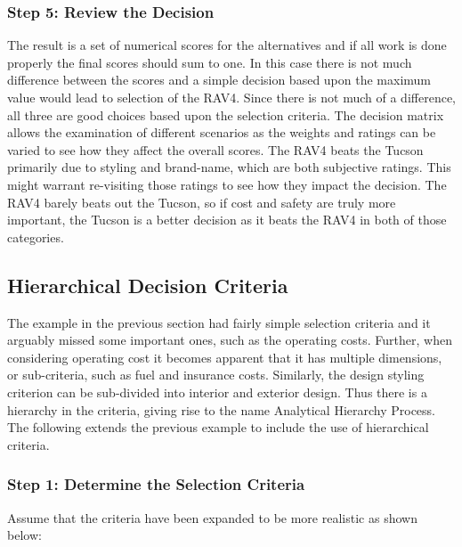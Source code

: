 \subsubsection*{Step 5: Review the
Decision}\label{step-5-review-the-decision}

The result is a set of numerical scores for the alternatives and if all
work is done properly the final scores should sum to one. In this case
there is not much difference between the scores and a simple decision
based upon the maximum value would lead to selection of the RAV4. Since
there is not much of a difference, all three are good choices based upon
the selection criteria. The decision matrix allows the examination of
different scenarios as the weights and ratings can be varied to see how
they affect the overall scores. The RAV4 beats the Tucson primarily due
to styling and brand-name, which are both subjective ratings. This might
warrant re-visiting those ratings to see how they impact the decision.
The RAV4 barely beats out the Tucson, so if cost and safety are truly
more important, the Tucson is a better decision as it beats the RAV4 in
both of those categories.

\subsection{Hierarchical Decision
Criteria}\label{hierarchical-decision-criteria}

The example in the previous section had fairly simple selection criteria
and it arguably missed some important ones, such as the operating costs.
Further, when considering operating cost it becomes apparent that it has
multiple dimensions, or sub-criteria, such as fuel and insurance costs.
Similarly, the design styling criterion can be sub-divided into interior
and exterior design. Thus there is a hierarchy in the criteria, giving
rise to the name Analytical Hierarchy Process. The following extends the
previous example to include the use of hierarchical criteria.

\subsubsection*{Step 1: Determine the Selection
Criteria}\label{step-1-determine-the-selection-criteria-1}

Assume that the criteria have been expanded to be more realistic as
shown below:

